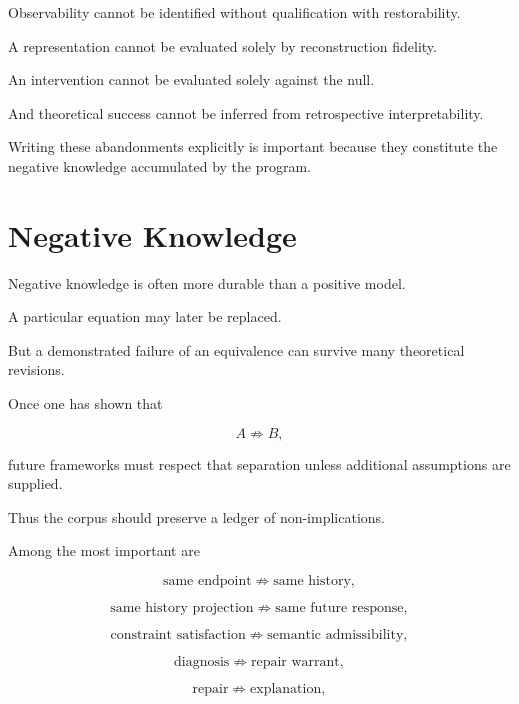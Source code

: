 \documentclass[11pt]{article}
\theoremstyle{remark}
\begin{document}
Observability cannot be identified without qualification with restorability.

A representation cannot be evaluated solely by reconstruction fidelity.

An intervention cannot be evaluated solely against the null.

And theoretical success cannot be inferred from retrospective interpretability.

Writing these abandonments explicitly is important because they constitute the negative knowledge accumulated by the program.

\section{Negative Knowledge}

Negative knowledge is often more durable than a positive model.

A particular equation may later be replaced.

But a demonstrated failure of an equivalence can survive many theoretical revisions.

Once one has shown that

\begin{equation}
A\not\Rightarrow B,
\end{equation}

future frameworks must respect that separation unless additional assumptions are supplied.

Thus the corpus should preserve a ledger of non-implications.

Among the most important are

\begin{equation}
\text{same endpoint}
\not\Rightarrow
\text{same history},
\end{equation}

\begin{equation}
\text{same history projection}
\not\Rightarrow
\text{same future response},
\end{equation}

\begin{equation}
\text{constraint satisfaction}
\not\Rightarrow
\text{semantic admissibility},
\end{equation}

\begin{equation}
\text{diagnosis}
\not\Rightarrow
\text{repair warrant},
\end{equation}

\begin{equation}
\text{repair}
\not\Rightarrow
\text{explanation},
\end{equation}
\end{document}
